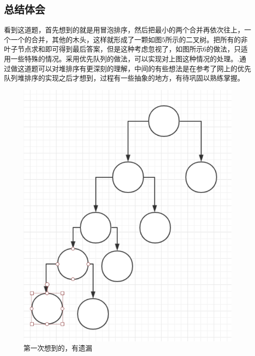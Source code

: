 \documentclass[UTF8]{ctexart}
\begin{document}
	\subsection{总结体会}
	\indent 看到这道题，首先想到的就是用冒泡排序，然后把最小的两个合并再依次往上，一个一个的合并，其他的木头，这样就形成了一颗如图$5$所示的二叉树。把所有的非叶子节点求和即可得到最后答案，但是这种考虑忽视了，如图所示$6$的做法，只适用一些特殊的情况。采用优先队列的做法，可以实现对上图这种情况的处理。.通过做这道题可以对堆排序有更深刻的理解，中间的有些想法是在参考了网上的优先队列堆排序的实现之后才想到，过程有一些抽象的地方，有待巩固以熟练掌握。
\begin{figure}[h]
	\centering
	\includegraphics[scale=0.6]{pic3.png}
	\caption{第一次想到的，有遗漏}
\end{figure}
\end{document}
